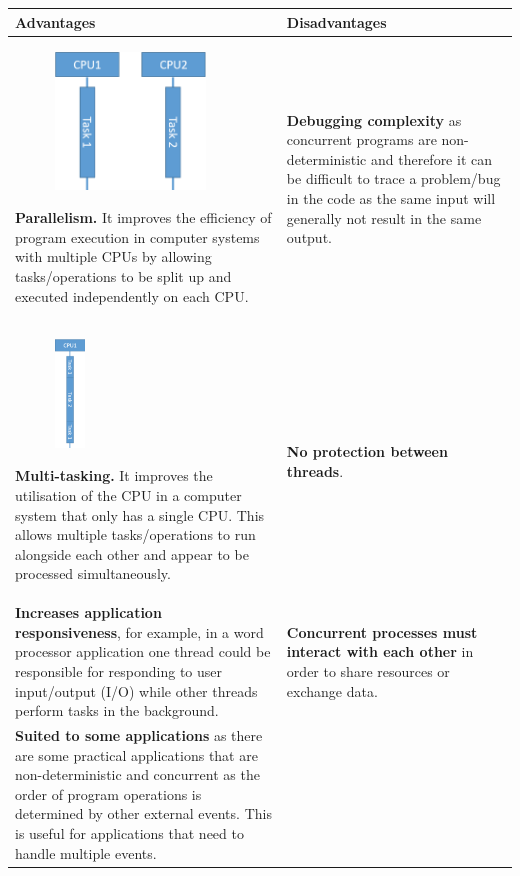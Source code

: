 \documentclass[a4paper]{systems-software}
\begin{document}
\begin{longtabu} to \textwidth {|X[1,l]|X[1,l]|}
    \hline
    \textbf{Advantages} & \textbf{Disadvantages}
    \\ \hline
    \begin{figure}
		\includegraphics[width=4cm]{images/chapter-3/parallelism.png}
	\end{figure} 
    \textbf{Parallelism.} It improves the efficiency of program execution in computer systems with multiple CPUs by allowing tasks/operations to be split up and executed independently on each CPU.
    &
    \textbf{Debugging complexity} as concurrent programs are non-deterministic and therefore it can be difficult to trace a problem/bug in the code as the same input will generally not result in the same output.  
    \\ \hline
    \begin{figure}
		\includegraphics[width=0.8cm]{images/chapter-3/multi-tasking.png}
	\end{figure}
    \textbf{Multi-tasking.} It improves the utilisation of the CPU in a computer system that only has a single CPU. This allows multiple tasks/operations to run alongside each other and appear to be processed simultaneously.
    &
    \textbf{No protection between threads}.
    \\ \hline
    \textbf{Increases application responsiveness}, for example, in a word processor application one thread could be responsible for responding to user input/output (I/O) while other threads perform tasks in the background.
    &
    \textbf{Concurrent processes must interact with each other} in order to share resources or exchange data.
    \\ \hline
    \textbf{Suited to some applications} as there are some practical applications that are non-deterministic and concurrent as the order of program operations is determined by other external events. This is useful for applications that need to handle multiple events.

\end{longtabu}
\end{document}
